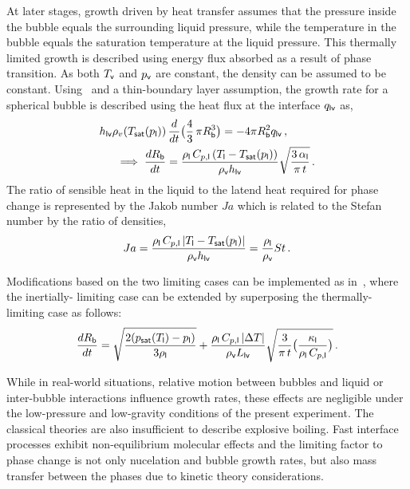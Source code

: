 At later stages, growth driven by heat transfer assumes that the pressure inside the bubble equals the surrounding liquid pressure, while the temperature in the bubble equals the saturation temperature at the liquid pressure.
This thermally limited growth is described using energy flux absorbed as a result of phase 
transition. As both $T_{\mathsf {v}}$ and $p_{\mathsf {v}}$ are constant, the density 
can be assumed to be constant. Using~ and a thin-boundary layer assumption,
 the growth rate for a spherical bubble is described using the heat flux at the interface $q_{\mathsf {lv}}$ as, 
  \begin{align}\label{eq:thermal-limit-radius}
   h_{\mathsf {lv}} \rho_{v}(T_{\mathsf {sat}}(p_{\mathsf {l}}))&\,\displaystyle\frac{d{}}{d{t}}\bigl(\frac{4}{3}\,\pi R^{3}_{\mathsf {b}}\bigr) = -4\pi R_{\mathsf {b}}^{2} q_{\mathsf {lv}}\,,\\
   \implies \displaystyle\frac{d{R_{\mathsf {b}}}}{d{t}} &= 
   \frac{\rho_{\mathsf {l}}\,C_{p,\mathsf {l}}\,(T_{\mathsf {l}} - T_{\mathsf {sat}}(p_{\mathsf {l}}))}{\rho_{\mathsf {v}}h_{\mathsf {lv}}}
   \sqrt{\frac{3\,\alpha_{\mathsf {l}}}{\pi\,t}}\,.
  \end{align}
The ratio of sensible heat in the liquid to the latend heat required for phase change
 is represented by the Jakob number $Ja$ which is related to the Stefan number by the 
 ratio of densities,
\begin{equation}
Ja = \frac{\rho_{\mathsf {l}}\,C_{p,\mathsf {l}}\,|T_{\mathsf {l}} - T_{\mathsf {sat}}(p_{\mathsf {l}})|}{\rho_{\mathsf {v}}h_{\mathsf {lv}} } = \frac{\rho_{\mathsf {l}}}{\rho_{\mathsf {v}}} St \,.
\end{equation}

Modifications based on the two limiting cases can be implemented as 
in~\cite{yaoThermodynamicCavitationModel2010}, where the inertially-
limiting case can be extended by superposing the thermally-limiting case as follows:
\begin{equation}
\frac{dR_{\mathsf {b}}}{dt} = \sqrt{\frac{2 (p_{\mathsf {sat}}(T_{\mathsf {l}}) - p_{\mathsf {l}})}{3\rho_{\mathsf {l}}}} 
+ \frac{\rho_{\mathsf {l}}\,C_{p,\mathsf {l}}\,|\Delta T|}{\rho_{\mathsf {v}}L_{\mathsf {lv}} } \sqrt{\frac{3}{\pi\,t}\bigl(\frac{\kappa_{\mathsf {l}}}{\rho_{\mathsf {l}}\,C_{p,\mathsf {l}}}\bigr)}\,.
\end{equation}

While in real-world situations, relative motion between bubbles and 
 liquid or inter-bubble interactions influence growth rates, these effects 
 are negligible under the low-pressure and low-gravity conditions of the present experiment. 
 The classical theories are also insufficient to describe explosive boiling.
 Fast interface processes exhibit non-equilibrium molecular effects
 and the limiting factor to phase change is not only nucelation and bubble 
 growth rates,
 but also mass transfer between the phases due to kinetic theory considerations. 

